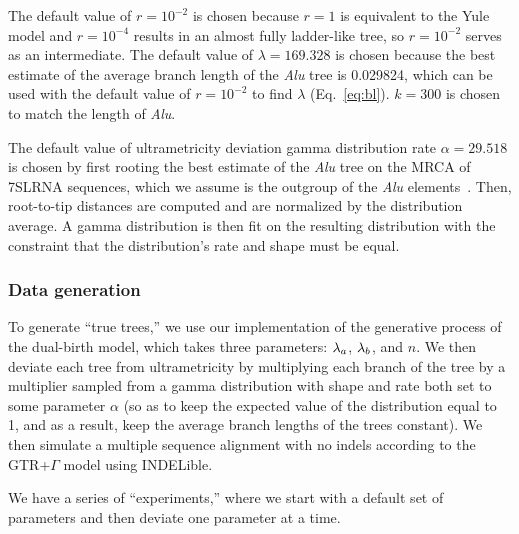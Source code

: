 The default value of $r=10^{-2}$ is chosen because $r=1$ is equivalent to the Yule model and $r=10^{-4}$ results in an almost fully ladder-like tree, so $r=10^{-2}$ serves as an intermediate. The default value of $\lambda=169.328$ is chosen because the best estimate of the average branch length of the \textit{Alu} tree is 0.029824, which can be used with the default value of $r=10^{-2}$ to find $\lambda$ (Eq.~\ref{eq:bl}). $k=300$ is chosen to match the length of \textit{Alu}.

The default value of ultrametricity deviation gamma distribution rate $\alpha=29.518$ is chosen by first rooting the best estimate of the \textit{Alu} tree on the MRCA of 7SLRNA sequences, which we assume is the outgroup of the \textit{Alu} elements~\cite{Deininger2011}. Then, root-to-tip distances are computed and are normalized by the distribution average. A gamma distribution is then fit on the resulting distribution with the constraint that the distribution's rate and shape must be equal.

\subsubsection{Data generation}
To generate ``true trees,'' we use our implementation of the generative process of the dual-birth model, which takes three parameters: $\lambda_a$, $\lambda_b$, and $n$. We then deviate each tree from ultrametricity by multiplying each branch of the tree by a multiplier sampled from a gamma distribution with shape and rate both set to some parameter $\alpha$ (so as to keep the expected value of the distribution equal to 1, and as a result, keep the average branch lengths of the trees constant). We then simulate a multiple sequence alignment with no indels according to the \gls{GTR}+$\Gamma$ model using INDELible.

We have a series of ``experiments,'' where we start with a default set of parameters and then deviate one parameter at a time.

